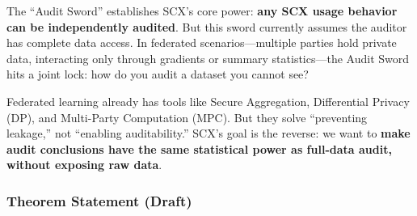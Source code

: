 \documentclass[
  12pt,
]{article}
\begin{document}
The ``Audit Sword'' establishes SCX's core power: \textbf{any SCX usage behavior can be independently audited}. But this sword currently assumes the auditor has complete data access. In federated scenarios---multiple parties hold private data, interacting only through gradients or summary statistics---the Audit Sword hits a joint lock: how do you audit a dataset you cannot see?

Federated learning already has tools like Secure Aggregation, Differential Privacy (DP), and Multi-Party Computation (MPC). But they solve ``preventing leakage,'' not ``enabling auditability.'' SCX's goal is the reverse: we want to \textbf{make audit conclusions have the same statistical power as full-data audit, without exposing raw data}.

\subsubsection{Theorem Statement (Draft)}\label{fa-statement}
\end{document}
